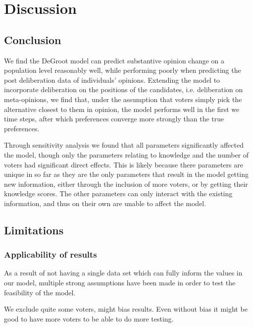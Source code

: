 \newpage
\chapter{Discussion}
\label{Discussion}


\section{Conclusion}

We find the DeGroot model can predict substantive opinion change on a
population level reasonably well, while performing poorly when predicting the
post deliberation data of individuals' opinions. Extending the model to
incorporate deliberation on the positions of the candidates, i.e. deliberation
on meta-opinions, we find that, under the assumption that voters simply pick
the alternative closest to them in opinion, the model performs well in the
first we time steps, after which preferences converge more strongly than the
true preferences.

Through sensitivity analysis we found that all parameters significantly
affected the model, though only the parameters relating to knowledge and the
number of voters had significant direct effects. This is likely because there
parameters are unique in so far as they are the only parameters that result in
the model getting new information, either through the inclusion of more voters,
or by getting their knowledge scores. The other parameters can only interact
with the existing information, and thus on their own are unable to affect the
model.





\section{Limitations}

\subsection{Applicability of results}

As a result of not having a single data set which can fully inform the values
in our model, multiple strong assumptions have been made in order to test the
feasibility of the model.


We exclude quite some voters, might bias results. Even without bias it might be good to have more voters to be able to do more testing.

